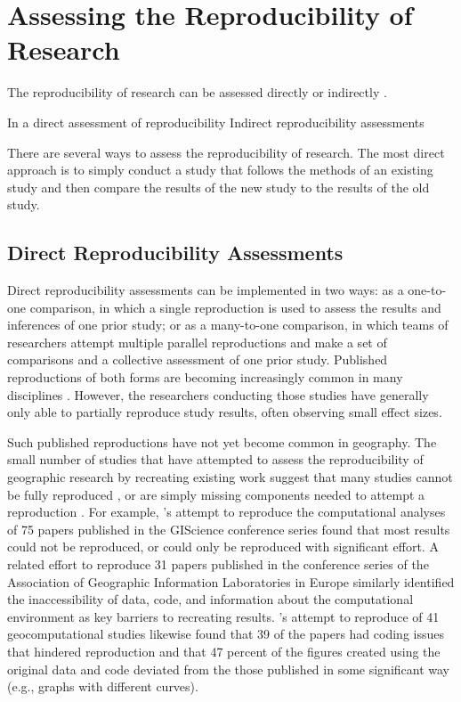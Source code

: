 \documentclass[]{interact}
\theoremstyle{plain}%
\theoremstyle{definition}
\theoremstyle{remark}
\begin{document}
\section*{Assessing the Reproducibility of Research}
The reproducibility of research can be assessed directly or indirectly \citep{NASEM2019}. 

In a direct assessment of reproducibility 
Indirect reproducibility assessments

There are several ways to assess the reproducibility of research.
The most direct approach is to simply conduct a study that follows the methods of an existing study and then compare the results of the new study to the results of the old study. 

\subsection*{Direct Reproducibility Assessments}
Direct reproducibility assessments can be implemented in two ways: as a one-to-one comparison, in which a single reproduction is used to assess the results and inferences of one prior study; or as a many-to-one comparison, in which teams of researchers attempt multiple parallel reproductions and make a set of comparisons and a collective assessment of one prior study.
Published reproductions of both forms are becoming increasingly common in many disciplines \citep[e.g.,][]{begley2012raise, camerer2016evaluating, camerer2018evaluating, wagenmakers2016registered}. 
However, the researchers conducting those studies have generally only able to partially reproduce study results, often observing small effect sizes.  

Such published reproductions have not yet become common in geography. 
The small number of studies that have attempted to assess the reproducibility of geographic research by recreating existing work suggest that many studies cannot be fully reproduced \citep{Kedron2021ssrn, nust2018, ostermann2021}, or are simply missing components needed to attempt a reproduction \citep{Kedron_VijayanRP, konkol2019, ostermann2021}.
For example, \citet{ostermann2021}'s attempt to reproduce the computational analyses of 75 papers published in the GIScience conference series found that most results could not be reproduced, or could only be reproduced with significant effort. 
A related effort to reproduce 31 papers published in the conference series of the Association of Geographic Information Laboratories in Europe \citep{Nust_AGILE_2020, Nust2021AGILE, Nust_AGILE_2022} similarly identified the inaccessibility of data, code, and information about the computational environment as key barriers to recreating results. 
\citet{konkol2019}'s attempt to reproduce of 41 geocomputational studies likewise found that 39 of the papers had coding issues that hindered reproduction and that 47 percent of the figures created using the original data and code deviated from the those published in some significant way (e.g., graphs with different curves). 
\end{document}
